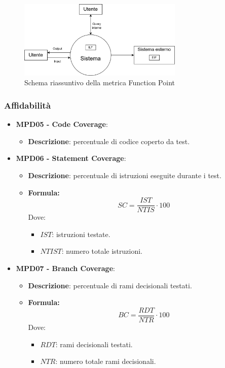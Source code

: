 \documentclass[10pt]{article}
\begin{document}
\begin{justify}
\begin{itemize}
\begin{itemize}
                \begin{figure}[H]
                \centering
                \includegraphics[width=0.7\textwidth]{FunctionPointFigure.png}
                \caption{Schema riassuntivo della metrica Function Point}
                \end{figure}
            \end{itemize}
\end{itemize}

\subsubsection{Affidabilità}
\begin{itemize}
    \item \textbf{MPD05 - Code Coverage}:
    \begin{itemize}
        \item \textbf{Descrizione}: percentuale di codice coperto da test.
    \end{itemize}
    \item \textbf{MPD06 - Statement Coverage}:
    \begin{itemize}
        \item   \textbf{Descrizione}: percentuale di istruzioni eseguite durante i test.
        \item   \textbf{Formula:}
                \[
                SC = \frac{IST}{NTIS} \cdot 100
                \]
                Dove:
                \begin{itemize}
                    \item $IST$: istruzioni testate.
                    \item $NTIST$: numero totale istruzioni.
                \end{itemize}
    \end{itemize}

    \item \textbf{MPD07 - Branch Coverage}:
    \begin{itemize}
        \item   \textbf{Descrizione}: percentuale di rami decisionali testati.
        \item   \textbf{Formula:}
            \[
            BC = \frac{RDT}{NTR} \cdot 100
            \]
            Dove:
            \begin{itemize}
                \item $RDT$: rami decisionali testati.
                \item $NTR$: numero totale rami decisionali.
            \end{itemize}
    \end{itemize}


\end{itemize}
\end{justify}
\end{document}
